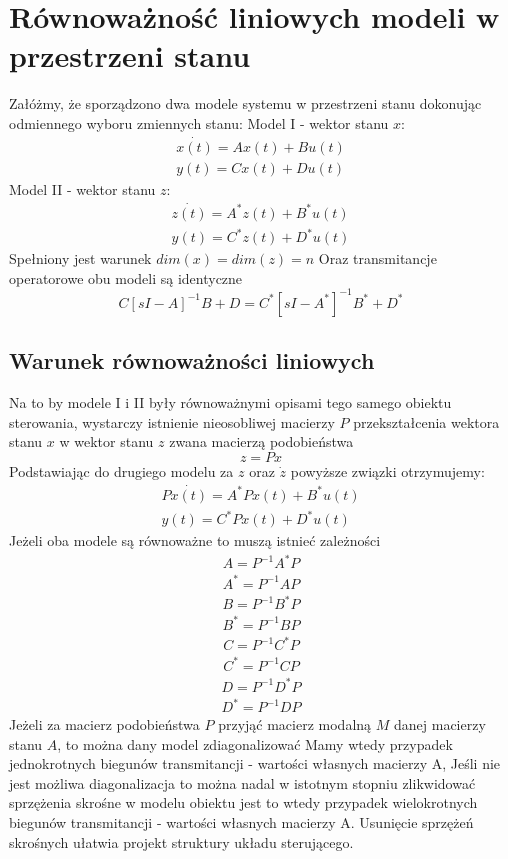 \documentclass{article}
\begin{document}
	\section{Równoważność liniowych modeli w przestrzeni stanu}
		Załóżmy, że sporządzono dwa modele systemu
		w przestrzeni stanu dokonując odmiennego wyboru zmiennych stanu:
		\newline
		Model I - wektor stanu $x$:
		\begin{align*}
			\dot{x(t)} = Ax(t) + Bu(t) \\
			y(t) = Cx(t) + Du(t)
		\end{align*}
		Model II - wektor stanu $z$:
		\begin{align*}
			\dot{z(t)} = A^*z(t) + B^*u(t) \\
			y(t) = C^*z(t) + D^*u(t)
		\end{align*}
		Spełniony jest warunek $dim(x)=dim(z)=n$
		Oraz transmitancje operatorowe obu modeli są identyczne
		\begin{equation}
			C[sI-A]^{-1}B+D = C^*[sI-A^*]^{-1}B^*+D^*
		\end{equation}
		\subsection{Warunek równoważności liniowych}
			Na to by modele I i II były równoważnymi opisami tego samego obiektu sterowania,
			wystarczy istnienie nieosobliwej macierzy $P$ przekształcenia
			wektora stanu
			$x$ w wektor stanu $z$ zwana macierzą podobieństwa 
			\begin{equation}
				z = Px
			\end{equation}
			Podstawiając do drugiego modelu za $z$ oraz $\dot{z}$
			powyższe związki otrzymujemy:
			\begin{align*}
				P\dot{x(t)} = A^*Px(t) + B^*u(t) \\
				y(t) = C^*Px(t) + D^*u(t)
			\end{align*}
			Jeżeli oba modele są równoważne to muszą istnieć zależności
			\begin{align*}
				A = P^{-1}A^*P \\
				A^* = P^{-1}AP 
			\end{align*}
			\begin{align*}
				B = P^{-1}B^*P \\
				B^* = P^{-1}BP 
			\end{align*}
			\begin{align*}
				C = P^{-1}C^*P \\
				C^* = P^{-1}CP 
			\end{align*}
			\begin{align*}
				D = P^{-1}D^*P \\
				D^* = P^{-1}DP 
			\end{align*}
			Jeżeli za macierz podobieństwa $P$ przyjąć macierz 
			modalną $M$ danej macierzy stanu $A$, to
			można dany model zdiagonalizować 
			Mamy wtedy przypadek jednokrotnych biegunów transmitancji
			- wartości własnych macierzy A,
			Jeśli nie jest możliwa diagonalizacja to można nadal w
			istotnym stopniu zlikwidować sprzężenia
			skrośne w modelu obiektu jest to wtedy przypadek wielokrotnych biegunów transmitancji - wartości własnych macierzy A.
			Usunięcie sprzężeń skrośnych ułatwia projekt struktury układu sterującego.
\end{document}
